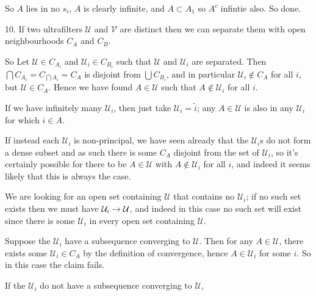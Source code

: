\documentclass[10pt]{article}
\newcommand{\U}{\mathcal{U}}
\newcommand{\V}{\mathcal{V}}
\begin{document}
So $A$ lies in no $s_i$, $A$ is clearly infinite, and $A\subset A_1$ so $A^c$ infintie also. So done.

10. If two ultrafilters $\U$ and $\V$ are distinct then we can separate them with open neighbourhoods $C_A$ and $C_B$.

So Let $\U \in C_{A_i}$ and $\U_i \in C_{B_i}$ such that $\U$ and $\U_i$ are separated. Then $\bigcap C_{A_i} = C_{\bigcap A_i} = C_A$ is disjoint from $\bigcup C_{B_i}$, and in particular $\U_i \not\in C_A$ for all $i$, but $\U \in C_A$. Hence we have found $A \in \U$ such that $A\not\in \U_i$ for all $i$.

If we have infinitely many $\U_i$, then just take $\U_i = \tilde{i}$; any $A \in \U$ is also in any $\U_i$ for which $i \in A$.

If instead each $\U_i$ is non-principal, we have seen already that the $\U_i$s do not form a dense subset and as such there is some $C_A$ disjoint from the set of $\U_i$, so it's certainly possible for there to be $A \in \U$ with $A\not\in \U_i$ for all $i$, and indeed it seems likely that this is always the case.

We are looking for an open set containing $\U$ that contains no $\U_i$; if no such set exists then we must have $\U_i \ra \U$, and indeed in this case no such set will exist since there is some $\U_i$ in every open set containing $\U$.

Suppose the $\U_i$ have a subsequence converging to $\U$. Then for any $A \in \U$, there exists some $\U_i \in C_A$ by the definition of convergence, hence $A \in \U_i$ for some $i$. So in this case the claim fails.

If the $\U_i$ do not have a subsequence converging to $\U$, 
\end{document}
